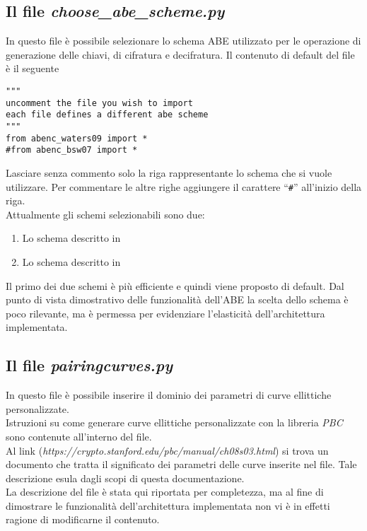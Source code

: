 \documentclass[a4paper,twoside,10pt,openany]{scrbook}
\begin{document}
\subsection{Il file \emph{choose\_abe\_scheme.py}}\label{sec:file_scheme}
In questo file è possibile selezionare lo schema ABE utilizzato per le operazione di generazione delle chiavi, di cifratura e decifratura.
Il contenuto di default del file è il seguente
\begin{verbatim}
"""
uncomment the file you wish to import
each file defines a different abe scheme
"""
from abenc_waters09 import *
#from abenc_bsw07 import *
\end{verbatim}
Lasciare senza commento solo la riga rappresentante lo schema che si vuole utilizzare. Per commentare le altre righe aggiungere il carattere ``\texttt{\#}'' all'inizio della riga. \\
Attualmente gli schemi selezionabili sono due:
\begin{enumerate}
 \item Lo schema descritto in \cite{waters2011ciphertext}
 \item Lo schema descritto in \cite{bethencourt2007ciphertext}
\end{enumerate}
Il primo dei due schemi è più efficiente e quindi viene proposto di default. Dal punto di vista dimostrativo delle funzionalità dell'\ac{ABE} la scelta dello schema è poco rilevante, ma è permessa per evidenziare l'elasticità dell'architettura implementata.
%
\subsection{Il file \emph{pairingcurves.py}}\label{sec:file_curve}
In questo file è possibile inserire il dominio dei parametri di curve ellittiche personalizzate. \\
Istruzioni su come generare curve ellittiche personalizzate con la libreria \emph{PBC} sono contenute all'interno del file.\\
Al link (\textit{https://crypto.stanford.edu/pbc/manual/ch08s03.html}) si trova un documento che tratta il significato dei parametri delle curve inserite nel file. Tale descrizione esula dagli scopi di questa documentazione.\\
La descrizione del file è stata qui riportata per completezza, ma al fine di dimostrare le funzionalità dell'architettura implementata non vi è in effetti ragione di modificarne il contenuto.
%
%
\end{document}
